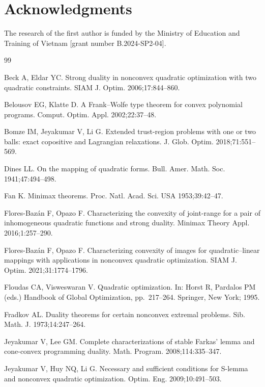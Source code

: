 \documentclass[]{interact}
\theoremstyle{plain}%
\theoremstyle{definition}
\theoremstyle{remark}
\begin{document}
	
	\section*{Acknowledgments}
	The research of the first author is funded by the Ministry of Education and Training of Vietnam [grant number B.2024-SP2-04].
	\begin{thebibliography}{99}
		
		
		Beck A, Eldar YC.
		Strong duality in nonconvex quadratic optimization with two quadratic constraints.
		{SIAM J. Optim.} 2006;17:844--860.
		
		Belousov EG, Klatte D.
		A Frank--Wolfe type theorem for convex polynomial programs.
		{Comput. Optim. Appl.} 2002;22:37--48.
		
		Bomze IM, Jeyakumar V, Li G.
		Extended trust-region problems with one or two balls: exact copositive and Lagrangian relaxations.
		{J. Glob. Optim.} 2018;71:551--569.
		
		Dines LL.
		On the mapping of quadratic forms.
		{Bull. Amer. Math. Soc.} 1941;47:494--498.
		
		Fan K.
		Minimax theorems.
		{Proc. Natl. Acad. Sci. USA} 1953;39:42--47. 
		
		Flores-Baz\'an F, Opazo F.
		Characterizing the convexity of joint-range for a pair of inhomogeneous quadratic functions and strong duality.
		{Minimax Theory Appl.} 2016;1:257--290.
		
		Flores-Baz\'an F, Opazo F.
		Characterizing convexity of images for quadratic--linear mappings with applications in nonconvex quadratic optimization.
		{SIAM J. Optim.} 2021;31:1774--1796.
		
		Floudas CA, Visweswaran V.
		Quadratic optimization.
		In: Horst R, Pardalos PM (eds.) {Handbook of Global Optimization}, pp.~217--264.
		Springer, New York; 1995.
		
		Fradkov AL.
		Duality theorems for certain nonconvex extremal problems.
		{Sib. Math. J.} 1973;14:247--264.
		
		Jeyakumar V, Lee GM.
		Complete characterizations of stable Farkas' lemma and cone-convex programming duality.
		{Math. Program.} 2008;114:335--347.
		
		Jeyakumar V, Huy NQ, Li G.
		Necessary and sufficient conditions for S-lemma and nonconvex quadratic optimization.
		{Optim. Eng.} 2009;10:491--503.
		

\end{thebibliography}
\end{document}
